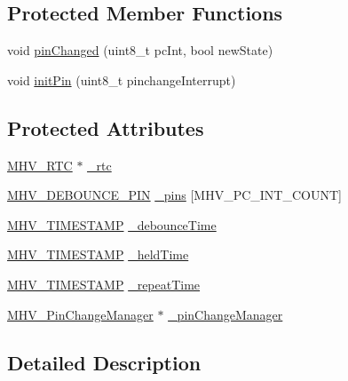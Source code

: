 \subsection*{\-Protected \-Member \-Functions}
\begin{DoxyCompactItemize}
\item 
void \hyperlink{class_m_h_v___debounce_abe77ae67fb3b94307edf52ddeaf768da}{pin\-Changed} (uint8\-\_\-t pc\-Int, bool new\-State)
\item 
void \hyperlink{class_m_h_v___debounce_ab5cc2cbf8e925708f01d2b7d1b4a2939}{init\-Pin} (uint8\-\_\-t pinchange\-Interrupt)
\end{DoxyCompactItemize}
\subsection*{\-Protected \-Attributes}
\begin{DoxyCompactItemize}
\item 
\hyperlink{class_m_h_v___r_t_c}{\-M\-H\-V\-\_\-\-R\-T\-C} $\ast$ \hyperlink{class_m_h_v___debounce_a33be0b2ba96f36fb920ad9f2dc27d4c8}{\-\_\-rtc}
\item 
\hyperlink{_m_h_v___debounce_8h_a1e51966b7fb269bd10a163734aa1ddfb}{\-M\-H\-V\-\_\-\-D\-E\-B\-O\-U\-N\-C\-E\-\_\-\-P\-I\-N} \hyperlink{class_m_h_v___debounce_a5cf65bfecfc0efd4d51e1506972d2796}{\-\_\-pins} \mbox{[}\-M\-H\-V\-\_\-\-P\-C\-\_\-\-I\-N\-T\-\_\-\-C\-O\-U\-N\-T\mbox{]}
\item 
\hyperlink{_m_h_v___r_t_c_8h_a1e30d3a92b1b868286bd0d619245d8a6}{\-M\-H\-V\-\_\-\-T\-I\-M\-E\-S\-T\-A\-M\-P} \hyperlink{class_m_h_v___debounce_ac3d3f83d43cbb2c7b4b74244c75d593a}{\-\_\-debounce\-Time}
\item 
\hyperlink{_m_h_v___r_t_c_8h_a1e30d3a92b1b868286bd0d619245d8a6}{\-M\-H\-V\-\_\-\-T\-I\-M\-E\-S\-T\-A\-M\-P} \hyperlink{class_m_h_v___debounce_a051a7a07c755f52f4444075ff897ac82}{\-\_\-held\-Time}
\item 
\hyperlink{_m_h_v___r_t_c_8h_a1e30d3a92b1b868286bd0d619245d8a6}{\-M\-H\-V\-\_\-\-T\-I\-M\-E\-S\-T\-A\-M\-P} \hyperlink{class_m_h_v___debounce_a422167777e3bfcf6b7b46b992058950f}{\-\_\-repeat\-Time}
\item 
\hyperlink{class_m_h_v___pin_change_manager}{\-M\-H\-V\-\_\-\-Pin\-Change\-Manager} $\ast$ \hyperlink{class_m_h_v___debounce_a2f9b551231f80bfa99603cae6c44e343}{\-\_\-pin\-Change\-Manager}
\end{DoxyCompactItemize}


\subsection{\-Detailed \-Description}


